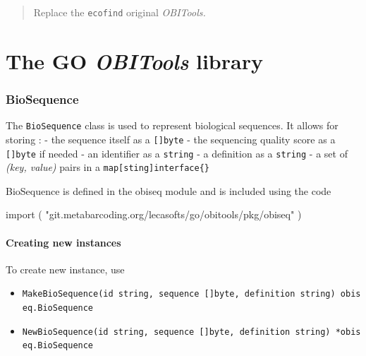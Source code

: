 \documentclass[
  letterpaper,
  DIV=11,
  numbers=noendperiod]{scrreprt}
\newenvironment{Shaded}{\begin{snugshade}}{\end{snugshade}}
\newcommand{\KeywordTok}[1]{\textcolor[rgb]{0.00,0.23,0.31}{#1}}
\newcommand{\OperatorTok}[1]{\textcolor[rgb]{0.37,0.37,0.37}{#1}}
\newcommand{\StringTok}[1]{\textcolor[rgb]{0.13,0.47,0.30}{#1}}
\providecommand{\tightlist}{%
  \setlength{\itemsep}{0pt}\setlength{\parskip}{0pt}}\usepackage{longtable,booktabs,array}
\begin{document}
\begin{quote}
Replace the \texttt{ecofind} original \emph{OBITools.}
\end{quote}

\part{The GO \emph{OBITools} library}

\hypertarget{biosequence}{%
\section*{BioSequence}\label{biosequence}}


The \texttt{BioSequence} class is used to represent biological
sequences. It allows for storing : - the sequence itself as a
\texttt{{[}{]}byte} - the sequencing quality score as a
\texttt{{[}{]}byte} if needed - an identifier as a \texttt{string} - a
definition as a \texttt{string} - a set of \emph{(key, value)} pairs in
a \texttt{map{[}sting{]}interface\{\}}

BioSequence is defined in the obiseq module and is included using the
code

\begin{Shaded}
\begin{Highlighting}[]
\KeywordTok{import} \OperatorTok{(}
    \StringTok{"git.metabarcoding.org/lecasofts/go/obitools/pkg/obiseq"}
\OperatorTok{)}
\end{Highlighting}
\end{Shaded}

\hypertarget{creating-new-instances}{%
\subsection*{Creating new instances}\label{creating-new-instances}}

To create new instance, use

\begin{itemize}
\tightlist
\item
  \texttt{MakeBioSequence(id\ string,\ sequence\ {[}{]}byte,\ definition\ string)\ obiseq.BioSequence}
\item
  \texttt{NewBioSequence(id\ string,\ sequence\ {[}{]}byte,\ definition\ string)\ *obiseq.BioSequence}
\end{itemize}
\end{document}

